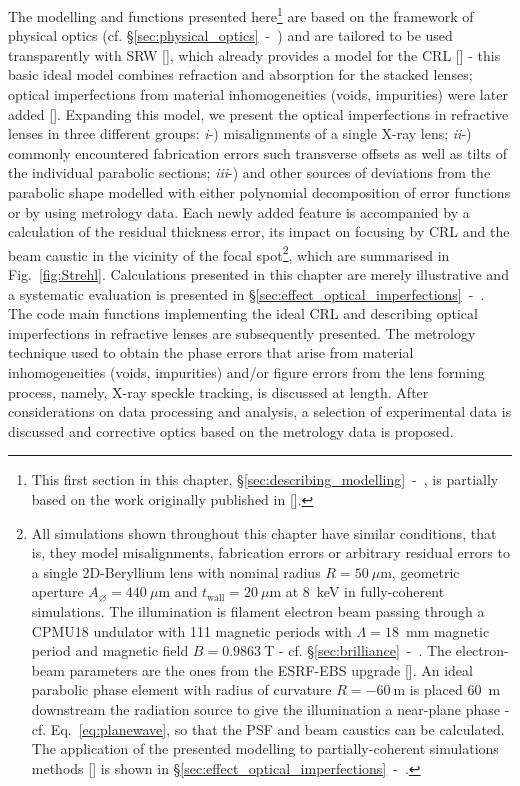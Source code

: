 \begin{refsection}
The modelling and functions presented here\footnote{This first section in this chapter, \S\ref{sec:describing_modelling}~-~\textit{}, is partially based on the work originally published in [\cite{Celestre2020b}].} are based on the framework of physical optics (cf. \S\ref{sec:physical_optics}~-~\textit{}) and are tailored to be used transparently with SRW [\cite{Chubar1998}], which already provides a model for the CRL [\cite{Baltser2011}] - this basic ideal model combines refraction and absorption for the stacked lenses; optical imperfections from material inhomogeneities (voids, impurities) were later added [\cite{Roth2014}]. Expanding this model, we present the optical imperfections in refractive lenses in three different groups: \textit{i}-) misalignments of a single X-ray lens; \textit{ii}-) commonly encountered fabrication errors such transverse offsets as well as tilts of the individual parabolic sections; \textit{iii}-) and other sources of deviations from the parabolic shape modelled with either polynomial decomposition of error functions or by using metrology data. Each newly added feature is accompanied by a calculation of the residual thickness error, its impact on focusing by CRL and the beam caustic in the vicinity of the focal spot\footnote{All simulations shown throughout this chapter have similar conditions, that is, they model misalignments, fabrication errors or arbitrary residual errors to a single 2D-Beryllium lens with nominal radius $R=50~\mu\text{m}$, geometric aperture $A_{\diameter}=440~\mu\text{m}$ and $t_\text{wall}=20~\mu$m at 8~keV in fully-coherent simulations. The illumination is filament electron beam passing through a CPMU18 undulator with 111 magnetic periods with $\Lambda=18$~mm magnetic period and magnetic field $B=0.9863~$T - cf. \S\ref{sec:brilliance}~-~\textit{}. The electron-beam parameters are the ones from the ESRF-EBS upgrade [\cite{orangebook}]. An ideal parabolic phase element with radius of curvature $R=-60~$m is placed 60~m downstream the radiation source to give the illumination a near-plane phase - cf. Eq.~\ref{eq:planewave}, so that the PSF and beam caustics can be calculated. The application of the presented modelling to partially-coherent simulations methods [\cite{Chubar2011}] is shown in \S\ref{sec:effect_optical_imperfections}~-~\textit{}.}, which are summarised in Fig.~\ref{fig:Strehl}. Calculations presented in this chapter are merely illustrative and a systematic evaluation is presented in \S\ref{sec:effect_optical_imperfections}~-~\textit{}. The code main functions implementing the ideal CRL and describing optical imperfections in refractive lenses are subsequently presented. The metrology technique used to obtain the phase errors that arise from material inhomogeneities (voids, impurities) and/or figure errors from the lens forming process, namely, X-ray speckle tracking, is discussed at length. After considerations on data processing and analysis, a selection of experimental data is discussed and corrective optics based on the metrology data is proposed. 



\end{refsection}

